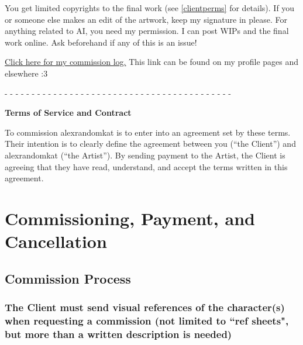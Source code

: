 \documentclass{article}
\newcommand{\hcm}[1][1]{\hspace{#1 cm}}
\begin{document}
\begin{flushleft}
\begin{center}
{		You get limited copyrights to the final work (see \ref{clientperms} for details). If you or someone else makes an edit of the artwork, keep my signature in please. For anything related to AI, you need my permission. I can post WIPs and the final work online. Ask beforehand if any of this is an issue!\\\hcm

		\href{https://github.com/AlexRandomkat/alexrandomkatCommLog/blob/main/alexrandomkat-commlog-PUBLIC.pdf}{Click here for my commission log.} This link can be found on my profile pages and elsewhere :3\\\hcm
		
		\begin{center}
			- - - - - - - - - - - - - - - - - - - - - - - - - - - - - - - - - - - - - - - - - -
		\end{center}
	}
\end{center}
\newpage

\begin{center}
	\parbox{14cm}{
		\begin{center}
			\textbf{\Large Terms of Service and Contract}\\\hcm
			
			To commission alexrandomkat is to enter into an agreement set by these terms. Their intention is to clearly define the agreement  between you (``the Client'') and alexrandomkat (``the Artist''). By sending payment to the Artist, the Client is agreeing that they have read, understand, and accept the terms written in this agreement.\\\hcm
		\end{center}
	}
\end{center}
\tableofcontents
\newpage

\section{Commissioning, Payment, and Cancellation}
\leftskip=1cm
	\subsection{Commission Process}
	\leftskip=2cm
		
 		\subsubsection[Character Description]{\normalfont The Client must send visual references of the character(s) when requesting a commission (not limited to ``ref sheets", but more than a written description is needed)}


\end{flushleft}
\end{document}
